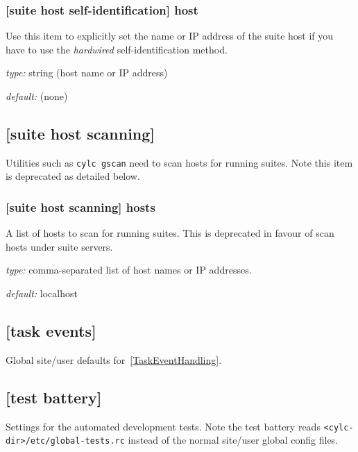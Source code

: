 \subsubsection[host]{[suite host self-identification] \textrightarrow host }

Use this item to explicitly set the name or IP address of the suite host
if you have to use the {\em hardwired} self-identification method.
\begin{myitemize}
\item {\em type:} string (host name or IP address)
\item {\em default:} (none)
\end{myitemize}

\subsection{[suite host scanning]}

Utilities such as \lstinline=cylc gscan= need to scan hosts for
running suites. Note this item is deprecated as detailed below.

\subsubsection[hosts]{[suite host scanning] \textrightarrow hosts }

A list of hosts to scan for running suites. This is deprecated in favour of
scan hosts under suite servers.

\begin{myitemize}
\item {\em type:} comma-separated list of host names or IP addresses.
\item {\em default:} localhost
\end{myitemize}

\subsection{[task events]}

Global site/user defaults for~\ref{TaskEventHandling}.

\subsection{[test battery]}

Settings for the automated development tests. Note the test battery reads
\lstinline=<cylc-dir>/etc/global-tests.rc= instead of the normal site/user
global config files.

